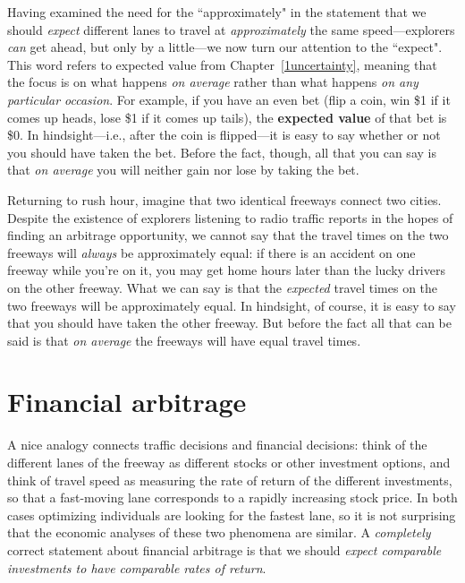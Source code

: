 Having examined the need for the ``approximately" in the statement that we should \emph{expect} different lanes to travel at \emph{approximately} the same speed---explorers \emph{can} get ahead, but only by a little---we now turn our attention to the ``expect". This word refers to expected value from Chapter~\ref{1uncertainty}, meaning that the focus is on what happens \emph{on average} rather than what happens \emph{on any particular occasion}. For example, if you have an even bet (flip a coin, win \$1 if it comes up heads, lose \$1 if it comes up tails), the \textbf{expected value} of that bet is \$0. In hindsight---i.e., after the coin is flipped---it is easy to say whether or not you should have taken the bet. Before the fact, though, all that you can say is that \emph{on average} you will neither gain nor lose by taking the bet.

Returning to rush hour, imagine that two identical freeways connect two cities. Despite the existence of explorers listening to radio traffic reports in the hopes of finding an arbitrage opportunity, we cannot say that the travel times on the two freeways will \emph{always} be approximately equal: if there is an accident on one freeway while you're on it, you may get home hours later than the lucky drivers on the other freeway. What we can say is that the \emph{expected} travel times on the two freeways will be approximately equal. In hindsight, of course, it is easy to say that you should have taken the other freeway. But before the fact all that can be said is that \emph{on average} the freeways will have equal travel times.


\section{Financial arbitrage}

A nice analogy connects traffic decisions and financial decisions: think of the different lanes of the freeway as different stocks or other investment options, and think of travel speed as measuring the rate of return of the different investments, so that a fast-moving lane corresponds to a rapidly increasing stock price. In both cases optimizing individuals are looking for the fastest lane, so it is not surprising that the economic analyses of these two phenomena are similar. A \emph{completely} correct statement about financial arbitrage is that we should \emph{expect comparable investments to have comparable rates of return}.

